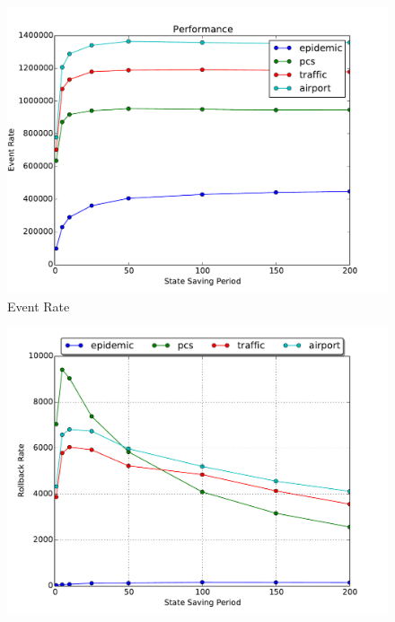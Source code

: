 \documentclass[11pt]{book}
\begin{document}
\begin{figure}
  \begin{minipage}{.5\textwidth}
    \begin{center}
      \includegraphics[width=\textwidth,keepaspectratio,quiet]{figs/state_saving/bc/eventrate.pdf} \\
      Event Rate \\
    \end{center}
  \end{minipage}%
  \hfill
  \begin{minipage}{.5\textwidth}
    \begin{center}
      \includegraphics[width=\textwidth,keepaspectratio,quiet]{figs/state_saving/bc/rb_rate.pdf} \\

\end{center}
\end{minipage}
\end{figure}
\end{document}
